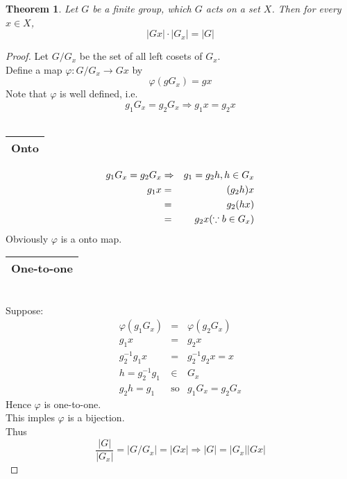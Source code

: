 \documentclass{article}
\theoremstyle{MyNonumberplain}
\theoremstyle{break}
\newtheorem*{proof}{Proof. }
\newcommand{\tmop}{\text}
\theoremstyle{break}
\newtheorem{theorem}{Theorem}[section]
\theoremstyle{break}
\theoremstyle{definition}
\theoremstyle{break}
\begin{document}
\begin{thmbox}
    \begin{theorem}
        Let $G$ be a finite group, which $G$ acts on a set $X$. Then for every $x \in
X$,
\[ | G x | \cdot | G_x | = | G | \]
    \end{theorem}
    \begin{prfbox}
        \begin{proof}
            Let $G / G_x$ be the set of all left cosets of $G_x$.\\

            Define a map $\varphi : G / G_x \rightarrow G x$ by
            \[ \varphi (g G_x) = g x \]
            Note that $\varphi$ is well defined, i.e.
            \[ g_1 G_x = g_2 G_x \Rightarrow g_1 x = g_2 x \]\\
            \begin{tabular}{|c|}
            \hline
            Onto\\
            \hline
            \end{tabular}
            \begin{eqnarray*}
            g_1 G_x = g_2 G_x & \Rightarrow & g_1 = g_2 h, h \in G_x\\
            g_1 x & = & (g_2 h) x\\
            & = & g_2 (h x)\\
            & = & g_2 x \hspace*{\fill} (\because b \in G_x)
            \end{eqnarray*}
            Obviously $\varphi$ is a onto map.\\

            \begin{tabular}{|c|}
            \hline
            One-to-one\\
            \hline
            \end{tabular}\\

            Suppose:
            \begin{eqnarray*}
            \varphi (g_1 G_x) & = & \varphi (g_2 G_x)\\
            g_1 x & = & g_2 x\\
            g_2^{- 1} g_1 x & = & g^{- 1}_2 g_2 x = x\\
            h = g_2^{- 1} g_1 & \in & G_x\\
            g_2 h = g_1 & \tmop{so} & g_1 G_x = g_2 G_x
            \end{eqnarray*}
            Hence $\varphi$ is one-to-one.\\

            This imples $\varphi$ is a bijection.\\

            Thus
            \[ \frac{| G |}{| G_x |} = | G / G_x | = | G x | \Rightarrow | G | = | G_x |
            | G x | \]
        \end{proof}
    \end{prfbox}
\end{thmbox}
\end{document}
